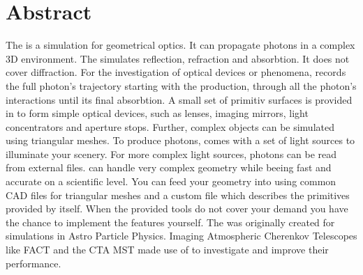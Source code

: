 \documentclass[11pt,a4paper,oneside,titlepage]{book}
\begin{document}
\chapter{Abstract}
%
The \tool{} is a simulation for geometrical optics. 
%
It can propagate photons in a complex 3D environment.
%
The \tool{} simulates reflection, refraction and absorbtion.
%
It does not cover diffraction.
%
For the investigation of optical devices or phenomena, \tool{} records the full photon's trajectory starting with the production, through all the photon's interactions until its final absorbtion.
%
A small set of primitiv surfaces is provided in \tool{} to form simple optical devices, such as lenses, imaging mirrors, light concentrators and aperture stops.
%
Further, complex objects can be simulated using triangular meshes.
%
To produce photons, \tool{} comes with a set of light sources to illuminate your scenery.
%
For more complex light sources, photons can be read from external files.
%
\tool{} can handle very complex geometry while beeing fast and accurate on a scientific level.
%
You can feed your geometry into \tool{} using common CAD files for triangular meshes and a custom \tool{} file which describes the primitives provided by \tool{} itself.
%
When the provided tools do not cover your demand you have the chance to implement the features yourself.   
%
The \tool{} was originally created for simulations in Astro Particle Physics.
%
Imaging Atmospheric Cherenkov Telescopes like FACT and the CTA MST made use of \tool{} to investigate and improve their performance.
%
\end{document}
